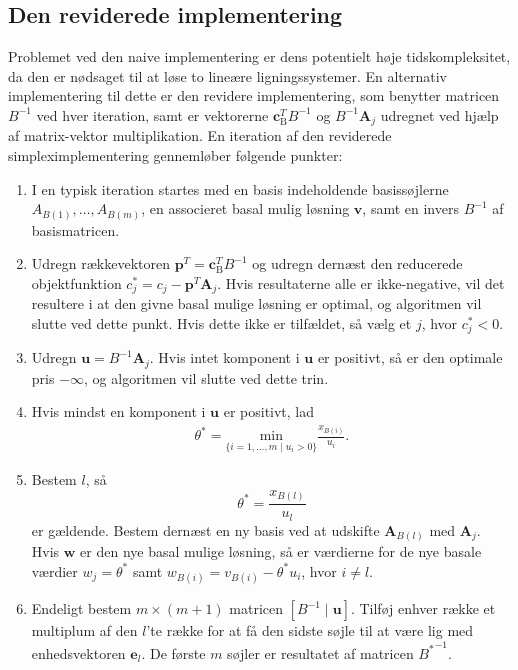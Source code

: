 \subsection{Den reviderede implementering}
Problemet ved den naive implementering er dens potentielt høje tidskompleksitet, da den er nødsaget til at løse to lineære ligningssystemer.
En alternativ implementering til dette er den revidere implementering, som benytter matricen $B^{-1}$ ved hver iteration, samt er vektorerne $\mathbf{c}_{\text{B}}^T B^{-1}$ og $B^{-1} \mathbf{A}_j$ udregnet ved hjælp af matrix-vektor multiplikation.
En iteration af den reviderede simpleximplementering gennemløber følgende punkter: 
% 
\begin{tcolorbox}[
title=Den reviderede implementering,
colback		= myblue!15,
colframe	= myblue!15,
coltitle	= black,
before skip	= 20pt plus 2pt,
after skip	= 20pt plus 2pt,
fonttitle	= \bfseries]
\begin{enumerate}
\item I en typisk iteration startes med en basis indeholdende basissøjlerne $A_{B(1)},\ldots,A_{B(m)}$, en associeret basal mulig løsning $\mathbf{v}$, samt en invers $B^{-1}$ af basismatricen. 
\item Udregn rækkevektoren $\mathbf{p}^T=\mathbf{c}_{\text{B}}^T B^{-1}$ og udregn dernæst den reducerede objektfunktion $c_j^* = c_j - \mathbf{p}^T \mathbf{A}_j$.
Hvis resultaterne alle er ikke-negative, vil det resultere i at den givne basal mulige løsning er optimal, og algoritmen vil slutte ved dette punkt. Hvis dette ikke er tilfældet, så vælg et $j$, hvor $c_j^* < 0$.
\item Udregn $\mathbf{u}=B^{-1}\mathbf{A}_j$.
Hvis intet komponent i $\mathbf{u}$ er positivt, så er den optimale pris $-\infty$, og algoritmen vil slutte ved dette trin. 
%
%
\item Hvis mindst en komponent i $\mathbf{u}$ er positivt, lad 
\begin{align*}
\theta^*=\underset{\{i=1,\ldots,m \mid u_i>0\}}{\text{min}}\frac{x_{B(i)}}{u_i}.
\end{align*}
\item Bestem $l$, så $$\theta^*=\frac{x_{B(l)}}{u_l}$$ er gældende. Bestem dernæst en ny basis ved at udskifte $\mathbf{A}_{B(l)}$ med $\mathbf{A}_j$. Hvis $\mathbf{w}$ er den nye basal mulige løsning, så er værdierne for de nye basale værdier $w_j=\theta^*$ samt $w_{B(i)}=v_{B(i)}-\theta^*u_i$, hvor $i \neq l$.
\item Endeligt bestem $m \times (m+1)$ matricen $\left [B^{-1} \mid \mathbf{u} \right ]$.
Tilføj enhver række et multiplum af den $l$'te række for at få den sidste søjle til at være lig med enhedsvektoren $\mathbf{e}_l$.
De første $m$ søjler er resultatet af matricen ${B^*}^{-1}$.
\end{enumerate}
\end{tcolorbox}
\noindent
%
%

